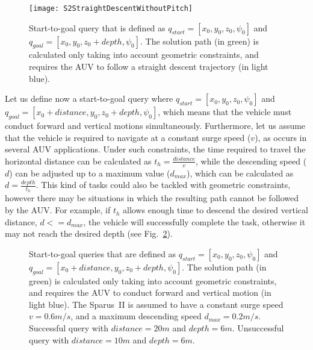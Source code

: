 \begin{figure}[htbp]
	\centering
	\texttt{[image: S2StraightDescentWithoutPitch]}
\caption[3D Start-to-goal query that requires a straight descent trajectory.]
{Start-to-goal query that is defined as  $q_{start} = [x_0, y_0, z_0,
\psi_0]$ and $q_{goal} = [x_0, y_0, z_0+depth, \psi_0]$. The solution path (in
green) is calculated only taking into account geometric constraints, and
requires the AUV to follow a straight descent trajectory (in light blue).}
\label{fig:S2StraightDescentWithoutPitch}
\end{figure}

Let us define now a start-to-goal query where $q_{start} = [x_0, y_0,
z_0, \psi_0]$ and $q_{goal} = [x_0+distance, y_0, z_0+depth, \psi_0]$, which
means that the vehicle must conduct forward and vertical motions simultaneously.
Furthermore, let us assume that the vehicle is required to navigate at a constant
surge speed ($v$), as occurs in several \ac{AUV} applications. Under such
constraints, the time required to travel the horizontal distance can be
calculated as $t_h = \frac{distance}{v}$, while the descending speed ($d$) can
be adjusted up to a maximum value ($d_{max}$), which can be calculated as $d =
\frac{depth}{t_h}$. This kind of tasks could also be tackled with geometric
constraints, however there may be situations in which the resulting path cannot
be followed by the \ac{AUV}. For example, if $t_h$ allows enough time to descend
the desired vertical distance, \ie $d <= d_{max}$, the vehicle will successfully
complete the task, otherwise it may not reach the desired depth (see
Fig.~\ref{fig:S2DescentConstraint}).

\begin{figure}[htbp]
    \myfloatalign
     \quad
\caption[3D Start-to-goal query that requires forward and vertical motion.]
{Start-to-goal queries that are defined as $q_{start} = [x_0, y_0,
z_0, \psi_0]$ and $q_{goal} = [x_0+distance, y_0, z_0+depth, \psi_0]$. The
solution path (in green) is calculated only taking into account geometric
constraints, and requires the AUV to conduct forward and vertical motion
(in light blue). The Sparus~II is assumed to have a constant surge speed
$v=0.6m/s$, and a maximum descending speed $d_{max}=0.2m/s$.
\protect {} Successful query with
$distance=20m$ and $depth=6m$.
\protect {} Unsuccessful query
with $distance=10m$ and $depth=6m$.}
\label{fig:S2DescentConstraint}
\end{figure}

